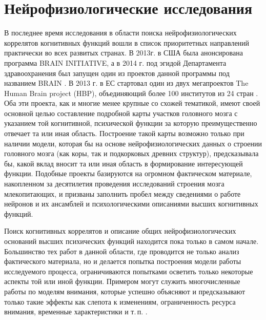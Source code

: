 \section{Нейрофизиологические исследования} \label{sect1_2}

В последнее время исследования в области поиска нейрофизиологических коррелятов когнитивных функций вошли в список приоритетных направлений практически во всех развитых странах. В 2013г. в США была анонсирована программа BRAIN INITIATIVE, а в 2014 г. под эгидой Департамента здравоохранения был запущен один из проектов данной программы под названием BRAIN \cite{NIH2014}. В 2013 г. в ЕС стартовал один из двух мегапроектов The Human Brain project (HBP), объединяющий более 100 институтов из 24 стран \cite{HBP2014}. Оба эти проекта, как и многие менее крупные со схожей тематикой, имеют своей основной целью составление подробной карты участков головного мозга с указанием той когнитивной, психической функции за которую преимущественно отвечает та или иная область. Построение такой карты возможно только при наличии модели, которая бы на основе нейрофизиологических данных о строении головного мозга (как коры, так и подкорковых древних структур), предсказывала бы, какой вклад вносит та или иная область в формирование интересующей функции. Подобные проекты базируются на огромном фактическом материале, накопленном за десятилетия проведения исследований строения мозга млекопитающих, и призваны заполнить пробел между сведениями о работе нейронов и их ансамблей и психологическими описаниями высших когнитивных функций. 

Поиск когнитивных коррелятов и описание общих нейрофизиологических оснований высших психических функций находится пока только в самом начале. Большинство тех работ в данной области, где проводится не только анализ фактического материала, но и делается попытка построения модели работы исследуемого процесса, ограничиваются попытками осветить только некоторые аспекты той или иной функции. Примером могут служить многочисленные работы по моделям внимания, которые успешно объясняют и предсказывают только такие эффекты как слепота к изменениям, ограниченность ресурса внимания, временные характеристики и т.\,п. \cite{Borji2013}.

